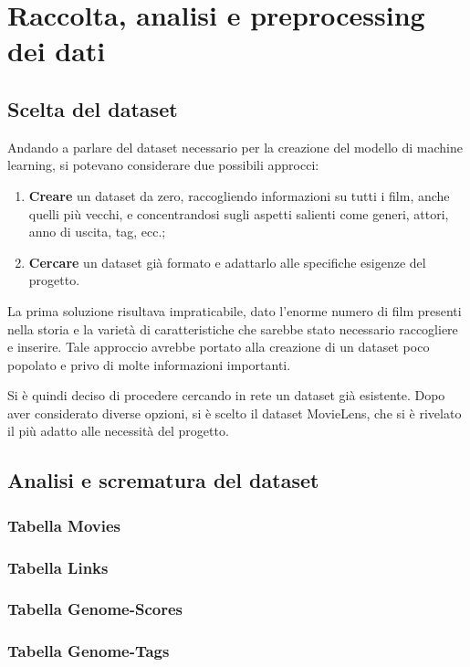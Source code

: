 \documentclass[a4paper,12pt]{article}
\begin{document}
\section{Raccolta, analisi e preprocessing dei dati}
\subsection{Scelta del dataset}
		Andando a parlare del dataset necessario per la creazione del modello di machine learning, si potevano considerare due possibili approcci:

		\begin{enumerate}
   			 \item \textbf{Creare} un dataset da zero, raccogliendo informazioni su tutti i film, anche quelli più vecchi, e concentrandosi sugli aspetti salienti come generi, attori, anno di uscita, tag, ecc.;
    			 \item \textbf{Cercare} un dataset già formato e adattarlo alle specifiche esigenze del progetto.
		\end{enumerate}

		La prima soluzione risultava impraticabile, dato l'enorme numero di film presenti nella storia e la varietà di caratteristiche che sarebbe stato necessario raccogliere e inserire. Tale approccio avrebbe portato alla creazione di un dataset poco popolato e privo di molte informazioni importanti.

		Si è quindi deciso di procedere cercando in rete un dataset già esistente. Dopo aver considerato diverse opzioni, si è scelto il dataset MovieLens, che si è rivelato il più adatto alle necessità del progetto.
\subsection{Analisi e scrematura del dataset}
\subsubsection{Tabella Movies}
\subsubsection{Tabella Links}
\subsubsection{Tabella Genome-Scores}
\subsubsection{Tabella Genome-Tags}
\end{document}
